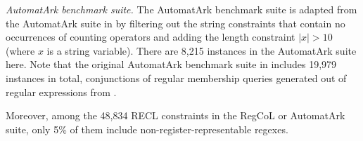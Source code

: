 \medskip
\noindent
\emph{AutomatArk benchmark suite.}
The AutomatArk benchmark suite is adapted from the AutomatArk suite in \cite{z3str3re} by filtering out the string constraints that contain no occurrences of counting operators and adding the length constraint $|x| > 10$ (where $x$ is a string variable). There are 8,215 instances in the AutomatArk suite here.
Note that the original AutomatArk benchmark suite in \cite{z3str3re} includes 19,979 instances in total, conjunctions of regular membership queries generated out of regular expressions from \cite{automatark}. 

Moreover, among the 48,834 RECL constraints in the RegCoL or AutomatArk suite, only 5\% of them include non-register-representable regexes.

